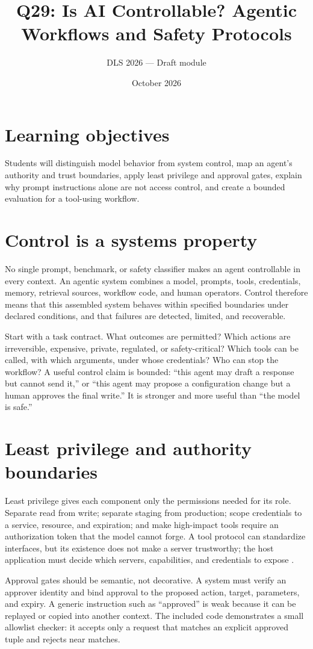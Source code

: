 \documentclass[11pt]{article}\usepackage[margin=1in]{geometry}\usepackage[T1]{fontenc}\usepackage{lmodern,microtype,hyperref,enumitem}\hypersetup{colorlinks=true,urlcolor=blue,citecolor=blue,linkcolor=blue}
\title{Q29: Is AI Controllable? Agentic Workflows and Safety Protocols}\author{DLS 2026 --- Draft module}\date{October 2026}
\begin{document}
\maketitle
\section*{Learning objectives}Students will distinguish model behavior from system control, map an agent's authority and trust boundaries, apply least privilege and approval gates, explain why prompt instructions alone are not access control, and create a bounded evaluation for a tool-using workflow.
\section{Control is a systems property}
No single prompt, benchmark, or safety classifier makes an agent controllable in every context. An agentic system combines a model, prompts, tools, credentials, memory, retrieval sources, workflow code, and human operators. Control therefore means that this assembled system behaves within specified boundaries under declared conditions, and that failures are detected, limited, and recoverable.

Start with a task contract. What outcomes are permitted? Which actions are irreversible, expensive, private, regulated, or safety-critical? Which tools can be called, with which arguments, under whose credentials? Who can stop the workflow? A useful control claim is bounded: ``this agent may draft a response but cannot send it,'' or ``this agent may propose a configuration change but a human approves the final write.'' It is stronger and more useful than ``the model is safe.''
\section{Least privilege and authority boundaries}
Least privilege gives each component only the permissions needed for its role. Separate read from write; separate staging from production; scope credentials to a service, resource, and expiration; and make high-impact tools require an authorization token that the model cannot forge. A tool protocol can standardize interfaces, but its existence does not make a server trustworthy; the host application must decide which servers, capabilities, and credentials to expose \cite{anthropic2024mcp}.

Approval gates should be semantic, not decorative. A system must verify an approver identity and bind approval to the proposed action, target, parameters, and expiry. A generic instruction such as ``approved'' is weak because it can be replayed or copied into another context. The included code demonstrates a small allowlist checker: it accepts only a request that matches an explicit approved tuple and rejects near matches.
\end{document}
